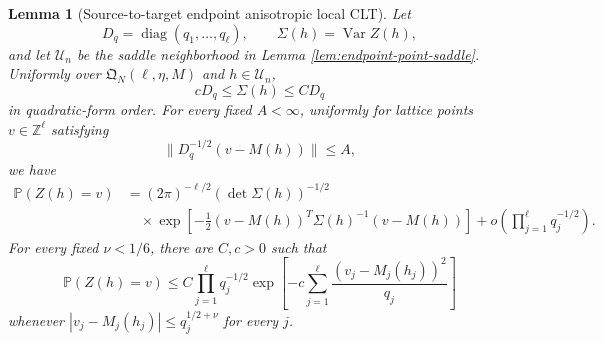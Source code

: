 \documentclass[11pt]{article}
\newtheorem{lemma}[theorem]{Lemma}
\theoremstyle{remark}
\newcommand{\Pp}{\mathbb P}
\newcommand{\Var}{\operatorname{Var}}
\newcommand{\diag}{\operatorname{diag}}
\begin{document}
\begin{lemma}[Source-to-target endpoint anisotropic local CLT]
\label{lem:endpoint-point-llt}
Let
\[
        D_q=\diag(q_1,\ldots,q_\ell),
        \qquad
        \Sigma(h)=\Var Z(h),
\]
and let $\mathcal U_n$ be the saddle neighborhood in Lemma
\ref{lem:endpoint-point-saddle}.  Uniformly over
$\mathfrak Q_N(\ell,\eta,M)$ and $h\in\mathcal U_n$,
\[
        cD_q\le\Sigma(h)\le CD_q
\tag{10.11}\label{eq:endpoint-point-covariance-comparison}
\]
in quadratic-form order.  For every fixed $A<\infty$, uniformly for lattice
points $v\in\mathbb Z^\ell$ satisfying
\[
        \|D_q^{-1/2}(v-M(h))\|\le A,
\]
we have
\[
\begin{aligned}
\Pp(Z(h)=v)
&=(2\pi)^{-\ell/2}(\det\Sigma(h))^{-1/2}\\
&\quad\times
\exp\left[-\frac12(v-M(h))^T\Sigma(h)^{-1}(v-M(h))\right]
+o\left(\prod_{j=1}^\ell q_j^{-1/2}\right).
\end{aligned}
\tag{10.12}\label{eq:endpoint-point-llt}
\]
For every fixed $\nu<1/6$, there are $C,c>0$ such that
\[
\Pp(Z(h)=v)
\le C\prod_{j=1}^\ell q_j^{-1/2}
\exp\left[-c\sum_{j=1}^\ell
\frac{(v_j-M_j(h_j))^2}{q_j}\right]
\tag{10.13}\label{eq:endpoint-point-local-upper}
\]
whenever
$|v_j-M_j(h_j)|\le q_j^{1/2+\nu}$ for every $j$.
\end{lemma}
\end{document}
